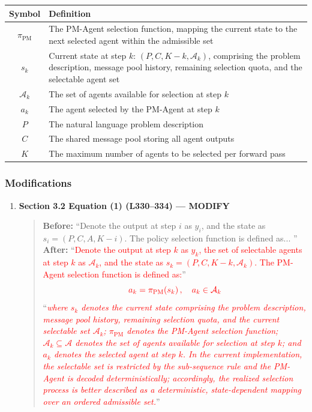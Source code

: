 \documentclass[11pt,a4paper]{article}
\begin{document}
\begin{center}
\begin{tabular}{cp{10cm}}
\toprule
\textbf{Symbol} & \textbf{Definition} \\
\midrule
$\pi_{\mathrm{PM}}$ & The PM-Agent selection function, mapping the current state to the next selected agent within the admissible set \\
\midrule
$s_k$ & Current state at step $k$: $(P, C, K-k, \mathcal{A}_k)$, comprising the problem description, message pool history, remaining selection quota, and the selectable agent set \\
\midrule
$\mathcal{A}_k$ & The set of agents available for selection at step $k$ \\
\midrule
$a_k$ & The agent selected by the PM-Agent at step $k$ \\
\midrule
$P$ & The natural language problem description \\
\midrule
$C$ & The shared message pool storing all agent outputs \\
\midrule
$K$ & The maximum number of agents to be selected per forward pass \\
\bottomrule
\end{tabular}
\end{center}

\subsubsection{Modifications}
\begin{enumerate}
\item \textbf{Section 3.2 Equation (1) (L330--334) --- MODIFY}
\begin{quote}
\textbf{Before:} ``Denote the output at step $i$ as $y_i$, and the state as $s_i = (P, C, A, K-i)$. The policy selection function is defined as... ''\\[4pt]
\textbf{After:} ``\textcolor{red}{Denote the output at step $k$ as $y_k$, the set of selectable agents at step $k$ as $\mathcal{A}_k$, and the state as $s_k=(P, C, K-k, \mathcal{A}_k)$. The PM-Agent selection function is defined as:}''
\begin{equation}
\textcolor{red}{a_k = \pi_{\mathrm{PM}}\!\left(s_k\right), \quad a_k \in \mathcal{A}_k}
\end{equation}
``\textit{\textcolor{red}{where $s_k$ denotes the current state comprising the problem description, message pool history, remaining selection quota, and the current selectable set $\mathcal{A}_k$; $\pi_{\mathrm{PM}}$ denotes the PM-Agent selection function; $\mathcal{A}_k \subseteq \mathcal{A}$ denotes the set of agents available for selection at step $k$; and $a_k$ denotes the selected agent at step $k$. In the current implementation, the selectable set is restricted by the sub-sequence rule and the PM-Agent is decoded deterministically; accordingly, the realized selection process is better described as a deterministic, state-dependent mapping over an ordered admissible set.}}''
\end{quote}
\end{enumerate}
\end{document}
